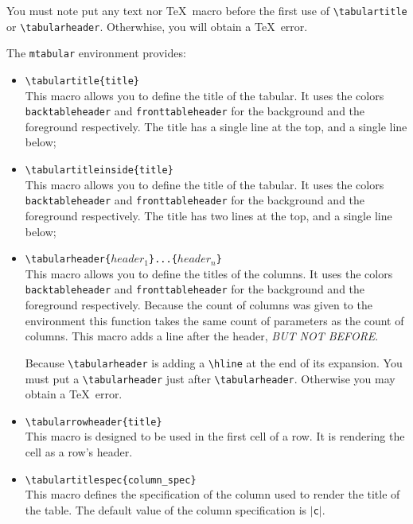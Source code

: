 \documentclass[book,taskpackage,specpackage,codepackage]{upmethodology-document}
\begin{document}
\begin{upmcaution}
	You must note put any text nor \TeX\ macro before the first use of \texttt{{\textbackslash}tabulartitle} or \texttt{{\textbackslash}tabularheader}. Otherwhise, you will obtain a \TeX\ error.
\end{upmcaution}


The \texttt{mtabular} environment provides:
\begin{itemize}
\item \texttt{{\textbackslash}tabulartitle\{title\}} \\
	This macro allows you to define the title of the tabular. It uses the colors \texttt{backtableheader} and \texttt{fronttableheader} for the background and the foreground respectively. The title has a single line at the top, and a single line below;

\item \texttt{{\textbackslash}tabulartitleinside\{title\}} \\
	This macro allows you to define the title of the tabular. It uses the colors \texttt{backtableheader} and \texttt{fronttableheader} for the background and the foreground respectively. The title has two lines at the top, and a single line below;

\item \texttt{{\textbackslash}tabularheader\{$header_1$\}...\{$header_n$\}} \\
	This macro allows you to define the titles of the columns. It uses the colors \texttt{backtableheader} and \texttt{fronttableheader} for the background and the foreground respectively. Because the count of columns was given to the environment this function takes the same count of parameters as the count of columns. This macro adds a line after the header, \emph{BUT NOT BEFORE}.
\begin{upmcaution}
	Because \texttt{{\textbackslash}tabularheader} is adding a \texttt{{\textbackslash}hline} at the end of its expansion. You must put a \texttt{{\textbackslash}tabularheader} just after \texttt{{\textbackslash}tabularheader}. Otherwise you may obtain a \TeX\ error.
\end{upmcaution}

\item \texttt{{\textbackslash}tabularrowheader\{title\}} \\
	This macro is designed to be used in the first cell of a row. It is rendering the cell as a row's header.

\item \texttt{{\textbackslash}tabulartitlespec\{column\_spec\}} \\
	This macro defines the specification of the column used to render the title of the table.
	The default value of the column specification is $|$\texttt{c}$|$.

\end{itemize}
\end{document}

